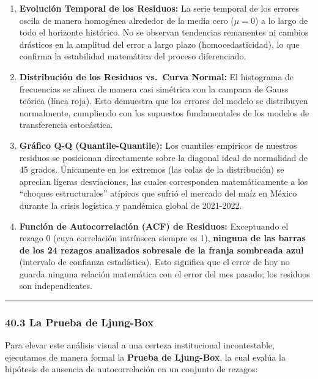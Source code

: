 \documentclass[11pt]{article}
\providecommand{\tightlist}{%
      \setlength{\itemsep}{0pt}\setlength{\parskip}{0pt}}
\begin{document}
\begin{enumerate}
\def\labelenumi{\arabic{enumi}.}
\tightlist
\item
  \textbf{Evolución Temporal de los Residuos:} La serie temporal de los
  errores oscila de manera homogénea alrededor de la media cero
  (\(\mu = 0\)) a lo largo de todo el horizonte histórico. No se
  observan tendencias remanentes ni cambios drásticos en la amplitud del
  error a largo plazo (homocedasticidad), lo que confirma la estabilidad
  matemática del proceso diferenciado.
\item
  \textbf{Distribución de los Residuos vs.~Curva Normal:} El histograma
  de frecuencias se alinea de manera casi simétrica con la campana de
  Gauss teórica (línea roja). Esto demuestra que los errores del modelo
  se distribuyen normalmente, cumpliendo con los supuestos fundamentales
  de los modelos de transferencia estocástica.
\item
  \textbf{Gráfico Q-Q (Quantile-Quantile):} Los cuantiles empíricos de
  nuestros residuos se posicionan directamente sobre la diagonal ideal
  de normalidad de 45 grados. Únicamente en los extremos (las colas de
  la distribución) se aprecian ligeras desviaciones, las cuales
  corresponden matemáticamente a los ``choques estructurales'' atípicos
  que sufrió el mercado del maíz en México durante la crisis logística y
  pandémica global de 2021-2022.
\item
  \textbf{Función de Autocorrelación (ACF) de Residuos:} Exceptuando el
  rezago 0 (cuya correlación intrínseca siempre es 1), \textbf{ninguna
  de las barras de los 24 rezagos analizados sobresale de la franja
  sombreada azul} (intervalo de confianza estadística). Esto significa
  que el error de hoy no guarda ninguna relación matemática con el error
  del mes pasado; los residuos son independientes.
\end{enumerate}

\begin{center}\rule{0.5\linewidth}{0.5pt}\end{center}

\hypertarget{la-prueba-de-ljung-box}{%
\subsubsection{40.3 La Prueba de
Ljung-Box}\label{la-prueba-de-ljung-box}}

Para elevar este análisis visual a una certeza institucional
incontestable, ejecutamos de manera formal la \textbf{Prueba de
Ljung-Box}, la cual evalúa la hipótesis de ausencia de autocorrelación
en un conjunto de rezagos:
\end{document}

